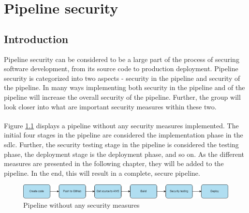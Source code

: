 \chapter{Pipeline security}
\label{Pipeline security}
\section{Introduction}
Pipeline security can be considered to be a large part of the process of securing software development, from its source code to production deployment. Pipeline security is categorized into two aspects - security in the pipeline and security of the pipeline\cite{inofpipeline}. In many ways implementing both security in the pipeline and of the pipeline will increase the overall security of the pipeline. Further, the group will look closer into what are important security measures within these two. 
\\~\\
Figure \ref{fig: Pipeline without any security measures} displays a \gls{pipeline} without any security measures implemented. The initial four stages in the pipeline are considered the implementation phase in the \acrshort{sdlc}. Further, the security testing stage in the pipeline is considered the testing phase, the deployment stage is the deployment phase, and so on. As the different measures are presented in the following chapter, they will be added to the pipeline. In the end, this will result in a complete, secure pipeline.

\vspace{2mm}
\begin{figure}[H]
    \centering
    \includegraphics[width=0.8\columnwidth]{Images/SecurePipeline-Page-3.drawio.png}
    \caption{Pipeline without any security measures}
    \label{fig: Pipeline without any security measures}
\end{figure}




